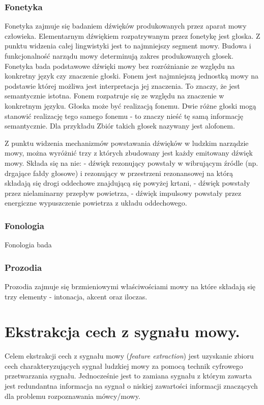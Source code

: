 \subsubsection{Fonetyka}
Fonetyka zajmuje się badaniem dźwięków produkowanych przez aparat mowy człowieka. Elementarnym dźwiękiem rozpatrywanym przez fonetykę jest głoska. Z punktu widzenia całej lingwistyki jest to najmniejszy segment mowy. Budowa i funkcjonalność narządu mowy determinują zakres produkowanych głosek. Fonetyka bada podstawowe dźwięki mowy bez rozróżnianie ze względu na konkretny język czy znaczenie głoski.
Fonem jest najmniejszą jednostką mowy na podstawie której możliwa jest interpretacja jej znaczenia. To znaczy, że jest semantycznie istotna. Fonem rozpatruje się ze względu na znaczenie w konkretnym języku. Głoska może być realizacją fonemu. Dwie różne głoski mogą stanowić realizację tego samego fonemu - to znaczy nieść tę samą informację semantycznie. Dla przykładu 
Zbiór takich głosek nazywany jest alofonem.

Z punktu widzenia mechanizmów powstawania dźwięków w ludzkim narządzie mowy, można wyróżnić trzy z których zbudowany jest każdy emitowany dźwięk mowy. Składa się na nie:
- dźwięk rezonujący powstały w wibrującym źródle (np. drgające fałdy głosowe) i rezonujący w przestrzeni rezonansowej na którą składają się drogi oddechowe znajdującą się powyżej krtani,
- dźwięk powstały przez nielaminarny przepływ powietrza,
- dźwięk impulsowy powstały przez energiczne wypuszczenie powietrza z układu oddechowego.

\subsubsection{Fonologia}
Fonologia bada

\subsubsection{Prozodia}
Prozodia zajmuje się brzmieniowymi właściwościami mowy na które składają się trzy elementy - intonacja, akcent oraz iloczas.

\section{Ekstrakcja cech z sygnału mowy.}
Celem ekstrakcji cech z sygnału mowy (\textit{feature extraction}) jest uzyskanie zbioru cech charakteryzujących sygnał ludzkiej mowy za pomocą technik cyfrowego przetwarzania sygnału. Jednocześnie jest to zamiana sygnału z którym zawarta jest redundantna informacja na sygnał o niskiej zawartości informacji znaczących dla problemu rozpoznawania mówcy/mowy. 

